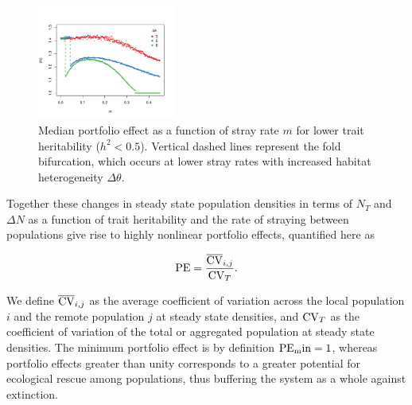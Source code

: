 \documentclass[twocolumn,preprintnumbers,amsmath,amssymb,superscriptaddress]{revtex4}
\begin{document}
\begin{figure}
\centering
\includegraphics[width=0.4\textwidth]{figs/fig_thetaPE.pdf}
\caption{
Median portfolio effect as a function of stray rate $m$ for lower trait heritability ($h^2 < 0.5$).
Vertical dashed lines represent the fold bifurcation, which occurs at lower stray rates with increased habitat heterogeneity $\Delta \theta$.
} \label{fig:thetaPE}
\end{figure}



Together these changes in steady state population densities in terms of $N_T$ and $\Delta N$ as a function of trait heritability and the rate of straying between populations give rise to highly nonlinear portfolio effects, quantified here as

\begin{equation}
  {\rm PE} = \frac{\overline{{\rm CV}}_{i,j}}{{\rm CV}_T}.
  \label{eq:pe}
\end{equation}

\noindent We define $\overline{{\rm CV}}_{i,j}$ as the average coefficient of variation across the local population $i$ and the remote population $j$ at steady state densities, and ${\rm CV}_T$ as the coefficient of variation of the total or aggregated population at steady state densities.
The minimum portfolio effect is by definition ${\rm PE_min}=1$, whereas portfolio effects greater than unity corresponds to a greater potential for ecological rescue among populations, thus buffering the system as a whole against extinction. 
\end{document}
